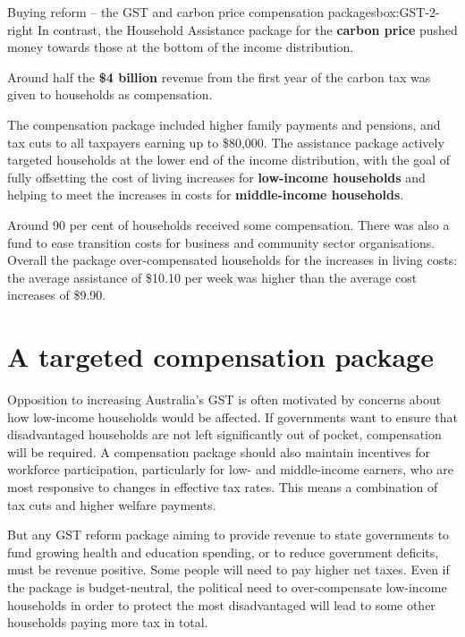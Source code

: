 {\begin{rultrabox}{Buying reform -- the GST and carbon price compensation packages}{box:GST-2-right}
In contrast, the Household Assistance package for the \textbf{carbon price} pushed money towards those at the bottom of the income distribution. 

Around half the \textbf{\$4 billion} revenue from the first year of the carbon tax was given to households as compensation.  

The compensation package included higher family payments and pensions, and tax cuts to all taxpayers earning up to \$80,000. The assistance package actively targeted households at the lower end of the income distribution, with the goal of fully offsetting the cost of living increases for \textbf{low-income households} and helping to meet the increases in costs for \textbf{middle-income households}. 

Around 90 per cent of households received some compensation. There was also a fund to ease transition costs for business and community sector organisations. Overall the package over-compensated households for the increases in living costs: the average assistance of \$10.10 per week was higher than the average cost increases of \$9.90. 


\end{rultrabox}}


\chapter{A targeted compensation package}\label{chapter:GST-3}
Opposition to increasing Australia’s GST is often motivated by concerns about how low-income households would be affected. If governments want to ensure that disadvantaged households are not left significantly out of pocket, compensation will be required. A compensation package should also maintain incentives for workforce participation, particularly for low- and middle-income earners, who are most responsive to changes in effective tax rates. This means a combination of tax cuts and higher welfare payments.  

But any GST reform package aiming to provide revenue to state governments to fund growing health and education spending,  or to reduce government deficits, must be revenue positive. Some people will need to pay higher net taxes. Even if the package is budget-neutral, the political need to over-compensate low-income households in order to protect the most disadvantaged will lead to some other households paying more tax in total.

